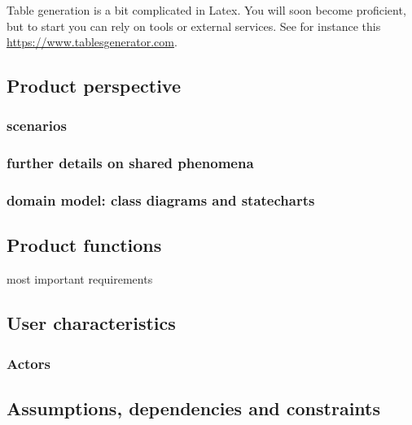 Table generation is a bit complicated in Latex. You will soon become proficient, but to start you can rely on tools or external services. See for instance this \href{https://www.tablesgenerator.com}{https://www.tablesgenerator.com}. 

\subsection{Product perspective}
\subsubsection{scenarios}
\subsubsection{further details on shared phenomena}
\subsubsection{domain model: class diagrams and statecharts}
\subsection{Product functions}
most important requirements
\subsection{User characteristics}
\subsubsection{Actors}
\subsection{Assumptions, dependencies and constraints}